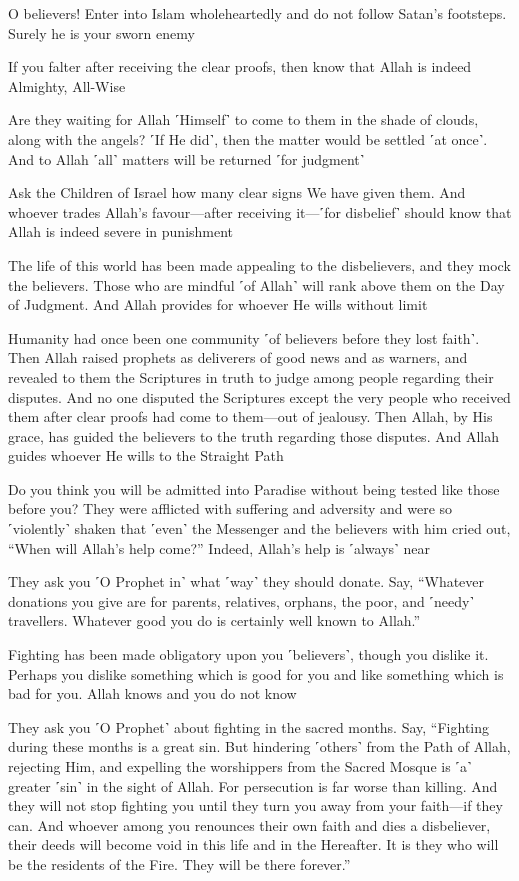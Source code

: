 O believers! Enter into Islam wholeheartedly and do not follow Satan’s footsteps. Surely he is your sworn enemy

If you falter after receiving the clear proofs, then know that Allah is indeed Almighty, All-Wise

Are they waiting for Allah ˹Himself˺ to come to them in the shade of clouds, along with the angels? ˹If He did˺, then the matter would be settled ˹at once˺. And to Allah ˹all˺ matters will be returned ˹for judgment˺

Ask the Children of Israel how many clear signs We have given them. And whoever trades Allah’s favour—after receiving it—˹for disbelief˺ should know that Allah is indeed severe in punishment

The life of this world has been made appealing to the disbelievers, and they mock the believers. Those who are mindful ˹of Allah˺ will rank above them on the Day of Judgment. And Allah provides for whoever He wills without limit

Humanity had once been one community ˹of believers before they lost faith˺. Then Allah raised prophets as deliverers of good news and as warners, and revealed to them the Scriptures in truth to judge among people regarding their disputes. And no one disputed the Scriptures except the very people who received them after clear proofs had come to them—out of jealousy. Then Allah, by His grace, has guided the believers to the truth regarding those disputes. And Allah guides whoever He wills to the Straight Path

Do you think you will be admitted into Paradise without being tested like those before you? They were afflicted with suffering and adversity and were so ˹violently˺ shaken that ˹even˺ the Messenger and the believers with him cried out, “When will Allah’s help come?” Indeed, Allah’s help is ˹always˺ near

They ask you ˹O Prophet in˺ what ˹way˺ they should donate. Say, “Whatever donations you give are for parents, relatives, orphans, the poor, and ˹needy˺ travellers. Whatever good you do is certainly well known to Allah.”

Fighting has been made obligatory upon you ˹believers˺, though you dislike it. Perhaps you dislike something which is good for you and like something which is bad for you. Allah knows and you do not know

They ask you ˹O Prophet˺ about fighting in the sacred months. Say, “Fighting during these months is a great sin. But hindering ˹others˺ from the Path of Allah, rejecting Him, and expelling the worshippers from the Sacred Mosque is ˹a˺ greater ˹sin˺ in the sight of Allah. For persecution is far worse than killing. And they will not stop fighting you until they turn you away from your faith—if they can. And whoever among you renounces their own faith and dies a disbeliever, their deeds will become void in this life and in the Hereafter. It is they who will be the residents of the Fire. They will be there forever.”

